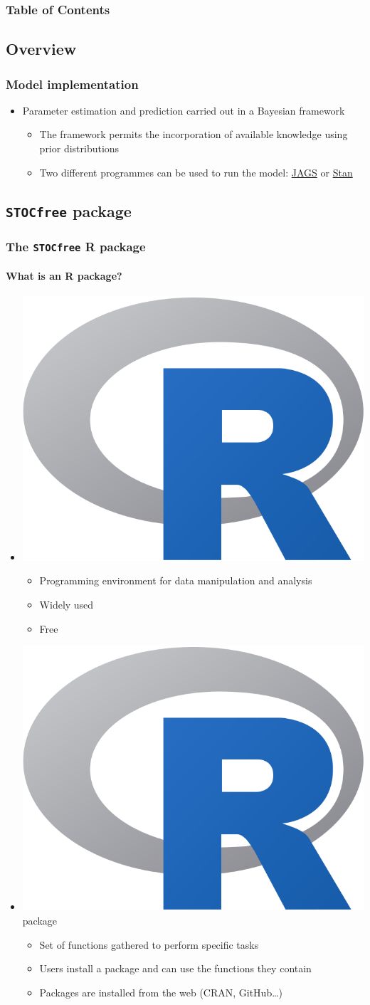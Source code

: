 \documentclass{beamer}
\begin{document}
\begin{frame}
\frametitle{Table of Contents}
  \tableofcontents[currentsection]
\end{frame} 

\subsection{Overview}

\begin{frame}
\frametitle{Model implementation}
\begin{itemize}
 \item{Parameter estimation and prediction carried out in a Bayesian framework}
\begin{itemize}
 \item{The framework permits the incorporation of available knowledge using prior distributions}
 \item{Two different programmes can be used to run the model: \href{https://sourceforge.net/projects/mcmc-jags/files/}{JAGS} or \href{https://mc-stan.org}{Stan}}
 \end{itemize}
\end{itemize}
\end{frame}


\subsection{\texttt{STOCfree} package}

\begin{frame}
\frametitle{The \texttt{STOCfree} R package}
\framesubtitle{What is an R package?}
\begin{itemize}
\item[]{\includegraphics[width=.07\textwidth]{imgs/Rlogo.png}}
\begin{itemize}
 \item{Programming environment for data manipulation and analysis}
 \item{Widely used}
 \item{Free}
\end{itemize}
\item[]{\includegraphics[width=.07\textwidth]{imgs/Rlogo.png} package}
 \begin{itemize}
  \item{Set of functions gathered to perform specific tasks}
  \item{Users install a package and can use the functions they contain}
  \item{Packages are installed from the web (CRAN, GitHub…)}
 \end{itemize}
\end{itemize}
\end{frame}
\end{document}
